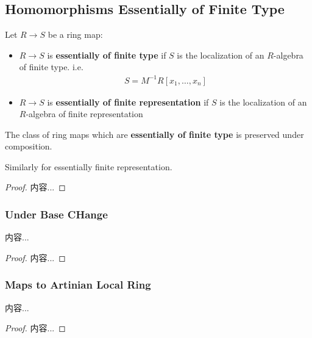 \documentclass[Total.tex]{subfiles}
\begin{document}
			\subsection{Homomorphisms Essentially of Finite Type}
				\begin{Def}
					Let $R\rightarrow S$ be a ring map:
					\begin{itemize}
						\item $R\rightarrow S$ is \textbf{essentially of finite type} if $S$ is the localization of an $R$-algebra of finite type. i.e.
						\begin{gather*}
							S=M^{-1}R[x_1,\dots,x_n]
						\end{gather*}
						\item $R\rightarrow S$ is \textbf{essentially of finite representation} if $S$ is the localization of an $R$-algebra of finite representation
					\end{itemize}
				\end{Def}
				
				\begin{lemma}
					The class of ring maps which are \textbf{essentially of finite type} is preserved under composition.
					
					Similarly for essentially finite representation.
				\end{lemma}
				\begin{proof}
					内容...
				\end{proof}
				\subsubsection{Under Base CHange}
					\begin{proposition}
						内容...
					\end{proposition}
					\begin{proof}
						内容...
					\end{proof}
				\subsubsection{Maps to Artinian Local Ring}
					\begin{lemma}
						内容...
					\end{lemma}
					\begin{proof}
						内容...
					\end{proof}
\end{document}
